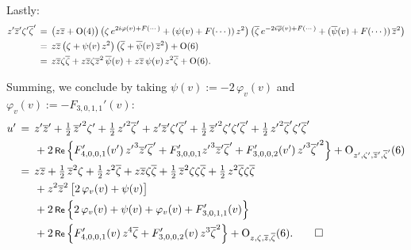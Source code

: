 \documentclass[12pt,twoside,leqno,openany]{amsart}
\begin{document}
Lastly:
\[
\aligned
z'\overline{z}'\zeta'\overline{\zeta}'
&
\,=\,
\big(
z\overline{z}
+
{\rm O}(4)
\big)\,
\big(
\zeta\,e^{2i\varphi(v)+F(\cdots)}
+
(\psi(v)+F(\cdots))\,z^2
\big)\,
\big(
\overline{\zeta}\,
e^{-2i\overline{\varphi}(v)+F(\cdots)}
+
(\overline{\psi}(v)+F(\cdots))\,\overline{z}^2
\big)
\\
&
\,=\,
z\overline{z}\,
\big(
\zeta
+
\psi(v)\,z^2
\big)\,
\big(
\overline{\zeta}
+
\overline{\psi}(v)\,
\overline{z}^2
\big)
+
{\rm O}(6)
\\
&
\,=\,
z\overline{z}\zeta\overline{\zeta}
+
z\overline{z}\zeta\overline{z}^2\,\overline{\psi}(v)
+
z\overline{z}\,\psi(v)\,z^2\overline{\zeta}
+
{\rm O}(6).
\endaligned
\]

Summing, we conclude by taking $\psi(v) := -2\, \varphi_v(v)$
and $\varphi_v(v) := - F_{3,0,1,1}'(v)$:
\begin{align*}
u'
&
\,=\,
z'\overline{z}'
+
\tfrac{1}{2}\,{\overline{z}'}^2\zeta'
+
\tfrac{1}{2}\,{z'}^2\overline{\zeta}'
+
z'\overline{z}'\zeta'\overline{\zeta}'
+
\tfrac{1}{2}\,{\overline{z}'}^2\zeta'\zeta'\overline{\zeta}'
+
\tfrac{1}{2}\,{z'}^2\overline{\zeta}'\zeta'\overline{\zeta}'
\\
&
\ \ \ \ \
+
2\,\Re\,
\Big\{
F_{4,0,0,1}'(v')\,
{z'}^3\overline{z}'\overline{\zeta}'
+
F_{3,0,0,1}'{z'}^3\overline{z}'\overline{\zeta}'
+
F_{3,0,0,2}'(v')\,{z'}^3{\overline{\zeta}'}^2
\Big\}
+
{\rm O}_{z',\zeta',\overline{z}',\overline{\zeta}'}(6)
\\
&
\,=\,
z\overline{z}
+
\tfrac{1}{2}\,\overline{z}^2\zeta
+
\tfrac{1}{2}\,z^2\overline{\zeta}
+
z\overline{z}\zeta\overline{\zeta}
+
\tfrac{1}{2}\,\overline{z}^2\zeta\zeta\overline{\zeta}
+
\tfrac{1}{2}\,z^2\overline{\zeta}\zeta\overline{\zeta}
\\
&
\ \ \ \ \
+
z^2\overline{z}^2\,
\big[
2\,\varphi_v(v)
+
\psi(v)
\big]
\\
&
\ \ \ \ \
+
2\,\Re\,
\Big\{
2\,\varphi_v(v)
+
\psi(v)
+
\varphi_v(v)
+
F_{3,0,1,1}'(v)
\Big\}
\\
&
\ \ \ \ \
+
2\,\Re\,
\Big\{
F_{4,0,0,1}'(v)\,
z^4\overline{\zeta}
+
F_{3,0,0,2}'(v)\,
z^3\overline{\zeta}^2
\Big\}
+
{\rm O}_{z,\zeta,\overline{z},\overline{\zeta}}(6).
\qedhere
\end{align*}
\endproof
\end{document}
